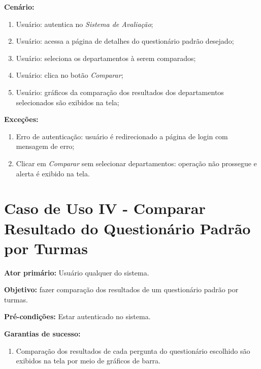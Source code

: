 \documentclass[
  12pt,       %
  openright,      %
  oneside,      %
  a4paper,      %
  english,      %
  french,        %
  spanish,     %
  brazil        %
  ]{abntex2-decsi}
\begin{document}
\begin{apendicesenv}
\begin{enumerate}
            \end{enumerate}
        
		\textbf{Cenário:}
		
		\begin{enumerate}
			\item Usuário: autentica no \textit{Sistema de Avaliação};           
			\item Usuário: acessa a página de detalhes do questionário padrão desejado;
            \item Usuário: seleciona os departamentos à serem comparados;
            \item Usuário: clica no botão \textit{Comparar};
			\item Usuário: gráficos da comparação dos resultados dos departamentos selecionados são exibidos na tela;
		\end{enumerate}
		
		\textbf{Exceções:}
		
			\begin{enumerate}	
				\item Erro de autenticação: usuário é redirecionado a página de login com mensagem de erro;
                \item Clicar em \textit{Comparar} sem selecionar departamentos: operação não prossegue e alerta é exibido na tela.
			\end{enumerate}

	\newpage
	
    \section{Caso de Uso IV - Comparar Resultado do Questionário Padrão por Turmas}
    
	\textbf{Ator primário:} Usuário qualquer do sistema.
				
    \textbf{Objetivo:} fazer comparação dos resultados de um questionário padrão por turmas.
    
	\textbf{Pré-condições:} Estar autenticado no sistema.
		
	\textbf{Garantias de sucesso:} 
        
            \begin{enumerate}
            
            \item Comparação dos resultados de cada pergunta do questionário escolhido são exibidos na tela por meio de gráficos de barra.  
            
            \end{enumerate}
        

\end{apendicesenv}
\end{document}
